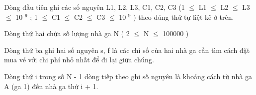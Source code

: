 Dòng đầu tiên ghi các số nguyên L1, L2, L3, C1, C2, C3 (1  $\le$  L1  $\le$  L2  $\le$  L3  $\le$  10   $^    9   $   ;  1  $\le$  C1  $\le$  C2  $\le$  C3  $\le$  10   $^    9   $   ) theo đúng thứ tự liệt kê ở trên.  

   Dòng thứ hai chứa số lượng nhà ga N ( 2  $\le$  N  $\le$  100000 )  

   Dòng thứ ba ghi hai số nguyên s, f là các chỉ số của hai nhà ga cần tìm cách đặt mua vé với chi phí nhỏ nhất để đi lại giữa chúng.  

   Dòng thứ i trong số N - 1 dòng tiếp theo ghi số nguyên là khoảng cách từ nhà ga A (ga 1) đến nhà ga thứ i + 1.
